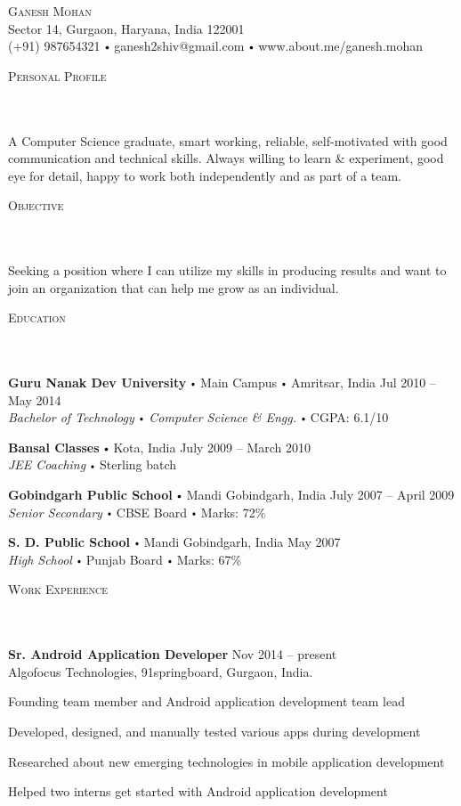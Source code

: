 \documentclass{article}
\newcommand{\contact}[3]{
\vspace*{5pt}
\begin{center}
{\LARGE \scshape {#1}}\\
\vspace{3pt}
#2 
\vspace{2pt}
#3
\end{center}
\vspace*{-8pt}
}
\newcommand{\header}[1]{{
\hspace*{-15pt}\vspace*{6pt} \textsc{#1}} \vspace*{-6pt} 
\lineunder
}
\newcommand{\lineunder}{
\vspace*{-8pt} \\ \hspace*{-18pt} 
\hrulefill \\
}
\newcommand{\content}{
\vspace*{2pt}%
}
\newcommand{\college}[5]{\vspace*{2pt}%
\textbf{#1} \labelitemi #2 \labelitemi #3 \hfill #4 \\ #5 
\vspace*{5pt}
}
\newcommand{\school}[4]{
\textbf{#1} \labelitemi #2 \hfill #3 \\ #4 \vspace*{5pt}
}
\newcommand{\employer}[4]{{
\vspace*{2pt}%
\textbf{#1} #2 \hfill #3\\ #4 \vspace*{2pt}}
}
\renewcommand{\labelitemi}{
$\vcenter{\hbox{\tiny$\bullet$}}$\hspace*{3pt}
}
\renewcommand{\labelitemii}{
$\vcenter{\hbox{\tiny$\bullet$}}$\hspace*{-3pt}
}
\newenvironment{bullet-list-minor}{
\begin{list}{\labelitemii}{\setlength\leftmargin{15pt} 
\topsep 0pt \itemsep -2pt}}{\vspace*{4pt}\end{list}
}
\begin{document}
\small
\smallskip
\vspace*{-44pt}

\contact{Ganesh Mohan}
{Sector 14, Gurgaon, Haryana, India 122001\\}
{(+91) 987654321 \labelitemi ganesh2shiv@gmail.com \labelitemi www.about.me/ganesh.mohan}
\vspace{15pt}
\header{Personal Profile}
    \content{A Computer Science graduate, smart working, reliable, self-motivated with good communication and technical skills. Always willing to learn \& experiment, good eye for detail, happy to work both independently and as part of a team.\vspace{5pt}}

\vspace*{4pt}%
\header{Objective}
    \content{Seeking a position where I can utilize my skills in producing results and want to join an organization that can help me grow as an individual.\vspace{5pt}}

\vspace*{4pt}%
\header{Education}
    \college{Guru Nanak Dev University}{Main Campus}{Amritsar, India}{Jul 2010 -- May 2014}
    {\textit{Bachelor of Technology \labelitemi Computer Science \& Engg.}\labelitemi CGPA: 6.1/10}

    \school{Bansal Classes}{Kota, India}{July 2009 -- March 2010}
    {\textit{JEE Coaching} \labelitemi Sterling batch}

    \school{Gobindgarh Public School}{Mandi Gobindgarh, India}{July 2007 -- April 2009}
    {\textit{Senior Secondary} \labelitemi CBSE Board \labelitemi Marks: 72\%}

    \school{S. D. Public School}{Mandi Gobindgarh, India}{May 2007}
    {\textit{High School} \labelitemi Punjab Board \labelitemi Marks: 67\%}

\vspace*{4pt}%
\header{Work Experience}
    \employer{Sr. Android Application Developer}{}{Nov 2014 -- present}{Algofocus Technologies, 91springboard, Gurgaon, India.}
	\begin{bullet-list-minor}
	\item Founding team member and Android application development team lead
	\item Developed, designed, and manually tested various apps during development
	\item Researched about new emerging technologies in mobile application development
	\item Helped two interns get started with Android application development
    \end{bullet-list-minor}
\end{document}
